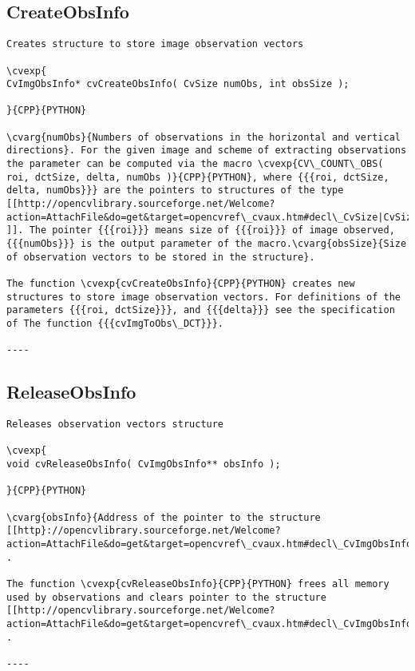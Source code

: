 \subsection{CreateObsInfo}
\begin{verbatim}
Creates structure to store image observation vectors

\cvexp{
CvImgObsInfo* cvCreateObsInfo( CvSize numObs, int obsSize );

}{CPP}{PYTHON}

\cvarg{numObs}{Numbers of observations in the horizontal and vertical directions}. For the given image and scheme of extracting observations the parameter can be computed via the macro \cvexp{CV\_COUNT\_OBS( roi, dctSize, delta, numObs )}{CPP}{PYTHON}, where {{{roi, dctSize, delta, numObs}}} are the pointers to structures of the type [[http://opencvlibrary.sourceforge.net/Welcome?action=AttachFile&do=get&target=opencvref\_cvaux.htm#decl\_CvSize|CvSize ]]. The pointer {{{roi}}} means size of {{{roi}}} of image observed, {{{numObs}}} is the output parameter of the macro.\cvarg{obsSize}{Size of observation vectors to be stored in the structure}.

The function \cvexp{cvCreateObsInfo}{CPP}{PYTHON} creates new structures to store image observation vectors. For definitions of the parameters {{{roi, dctSize}}}, and {{{delta}}} see the specification of The function {{{cvImgToObs\_DCT}}}.

----
\end{verbatim}
\subsection{ReleaseObsInfo}
\begin{verbatim}
Releases observation vectors structure

\cvexp{
void cvReleaseObsInfo( CvImgObsInfo** obsInfo );

}{CPP}{PYTHON}

\cvarg{obsInfo}{Address of the pointer to the structure [[http}://opencvlibrary.sourceforge.net/Welcome?action=AttachFile&do=get&target=opencvref\_cvaux.htm#decl\_CvImgObsInfo|CvImgObsInfo]] .

The function \cvexp{cvReleaseObsInfo}{CPP}{PYTHON} frees all memory used by observations and clears pointer to the structure [[http://opencvlibrary.sourceforge.net/Welcome?action=AttachFile&do=get&target=opencvref\_cvaux.htm#decl\_CvImgObsInfo|CvImgObsInfo]] .

----
\end{verbatim}
